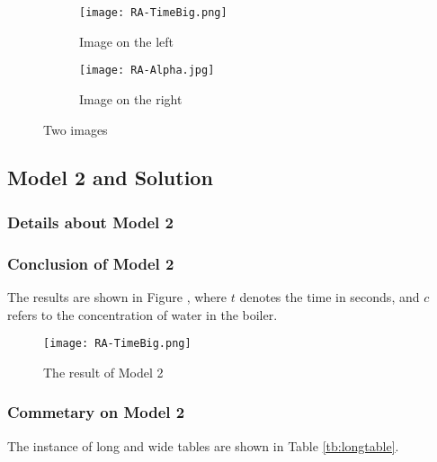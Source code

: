 \documentclass[12pt]{article}  %
\begin{document}
\begin{figure}[htbp]
	\centering
	\begin{subfigure}[b]{.45\textwidth}
		\texttt{[image: RA-TimeBig.png]}
		\caption{Image on the left}\label{subfig:left}
	\end{subfigure}
	\begin{subfigure}[b]{.45\textwidth}
		\texttt{[image: RA-Alpha.jpg]}
		\caption{Image on the right}\label{subfig:right}
	\end{subfigure}
	\caption{Two images}\label{fig:subfigures}
\end{figure}








\subsection{Model 2 and Solution}
\subsubsection{Details about Model 2}


\subsubsection{Conclusion of Model 2}
The results are shown in Figure , where $t$ denotes the time in seconds, and $c$ refers to the concentration of water in the boiler.

\begin{figure}[htbp]
\centering
\texttt{[image: RA-TimeBig.png]}
\caption{The result of Model 2}\label{fig:666}
\end{figure}

\subsubsection{Commetary on Model 2}
The instance of long and wide tables are shown in Table \ref{tb:longtable}.
\end{document}
